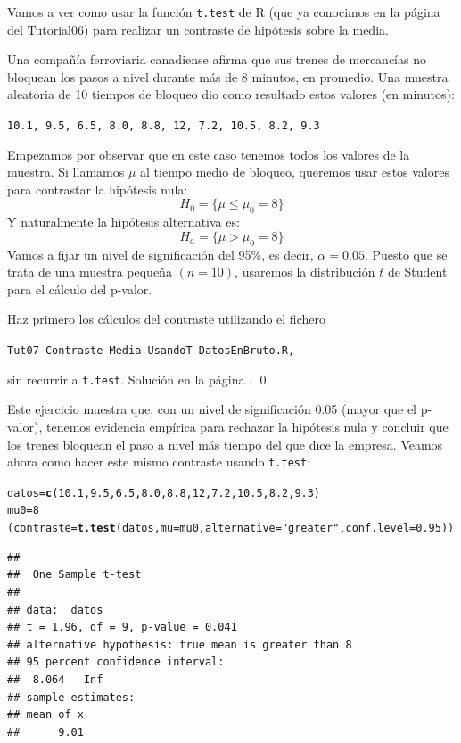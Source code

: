 \documentclass[10pt,a4paper]{article}\usepackage[]{graphicx}\usepackage[]{color}
\makeatletter
\newcommand{\hlnum}[1]{\textcolor[rgb]{0.686,0.059,0.569}{#1}}%
\newcommand{\hlstr}[1]{\textcolor[rgb]{0.192,0.494,0.8}{#1}}%
\newcommand{\hlstd}[1]{\textcolor[rgb]{0.345,0.345,0.345}{#1}}%
\newcommand{\hlkwb}[1]{\textcolor[rgb]{0.69,0.353,0.396}{#1}}%
\newcommand{\hlkwc}[1]{\textcolor[rgb]{0.333,0.667,0.333}{#1}}%
\newcommand{\hlkwd}[1]{\textcolor[rgb]{0.737,0.353,0.396}{\textbf{#1}}}%
\newenvironment{kframe}{%
 \def\at@end@of@kframe{}%
 \ifinner\ifhmode%
  \def\at@end@of@kframe{\end{minipage}}%
  \begin{minipage}{\columnwidth}%
 \fi\fi%
 \def\FrameCommand##1{\hskip\@totalleftmargin \hskip-\fboxsep
 \colorbox{shadecolor}{##1}\hskip-\fboxsep
     \hskip-\linewidth \hskip-\@totalleftmargin \hskip\columnwidth}%
 \MakeFramed {\advance\hsize-\width
   \@totalleftmargin\z@ \linewidth\hsize
   \@setminipage}}%
 {\par\unskip\endMakeFramed%
 \at@end@of@kframe}
\newenvironment{knitrout}{}{} %
\newcounter {cont01}
\makeatother
\begin{document}
Vamos a ver como usar la función {\tt t.test} de R (que ya conocimos en la página \pageref{tut06-tut06:subsubsec:CocinandoMuestras} del Tutorial06) para realizar un contraste de hipótesis sobre la media.

Una compañía ferroviaria canadiense afirma que sus trenes de mercancías no bloquean los pasos a
nivel durante más de 8 minutos, en promedio. Una muestra aleatoria de 10 tiempos de bloqueo dio
como resultado estos valores (en minutos):

\begin{center}
{\tt 10.1, 9.5, 6.5, 8.0, 8.8, 12,  7.2, 10.5, 8.2, 9.3}
\end{center}

Empezamos por observar que en este caso tenemos todos los valores de la muestra. Si llamamos $\mu$ al tiempo medio de bloqueo, queremos usar estos valores para contrastar la hipótesis nula:
\[H_0=\{ \mu \leq \mu_0=8 \}\]
Y naturalmente la hipótesis alternativa es:
\[H_a=\{ \mu > \mu_0=8 \}\]
Vamos a fijar un nivel de significación del 95\%, es decir, $\alpha=0.05$. Puesto que se trata de una muestra pequeña $(n=10)$, usaremos la distribución $t$ de Student para el cálculo del p-valor.

\begin{ejercicio}
\label{tut07:ejercicio12}
Haz primero los cálculos del contraste utilizando el fichero
\begin{center}
{\tt Tut07-Contraste-Media-UsandoT-DatosEnBruto.R,}
\end{center}
sin recurrir a {\tt t.test}. Solución en la página \pageref{tut07:ejercicio12:sol}.
\qed
\end{ejercicio}

Este ejercicio muestra que, con un nivel de significación 0.05 (mayor que el p-valor), tenemos evidencia empírica para rechazar la hipótesis nula y concluir que los trenes bloquean el paso a nivel más tiempo del que dice la empresa. Veamos ahora como hacer este mismo contraste usando {\tt t.test}:

\begin{knitrout}
\color{fgcolor}\begin{kframe}
\begin{alltt}
\hlstd{datos}\hlkwb{=}\hlkwd{c}\hlstd{(}\hlnum{10.1}\hlstd{,} \hlnum{9.5}\hlstd{,} \hlnum{6.5}\hlstd{,} \hlnum{8.0}\hlstd{,} \hlnum{8.8}\hlstd{,} \hlnum{12}\hlstd{,} \hlnum{7.2}\hlstd{,} \hlnum{10.5}\hlstd{,} \hlnum{8.2}\hlstd{,} \hlnum{9.3}\hlstd{)}
\hlstd{mu0}\hlkwb{=}\hlnum{8}
\hlstd{(contraste} \hlkwb{=} \hlkwd{t.test}\hlstd{(datos,}\hlkwc{mu}\hlstd{=mu0,}\hlkwc{alternative}\hlstd{=}\hlstr{"greater"}\hlstd{,}\hlkwc{conf.level} \hlstd{=} \hlnum{0.95}\hlstd{))}
\end{alltt}
\begin{verbatim}
## 
## 	One Sample t-test
## 
## data:  datos
## t = 1.96, df = 9, p-value = 0.041
## alternative hypothesis: true mean is greater than 8
## 95 percent confidence interval:
##  8.064   Inf
## sample estimates:
## mean of x 
##      9.01
\end{verbatim}
\end{kframe}
\end{knitrout}
\end{document}
